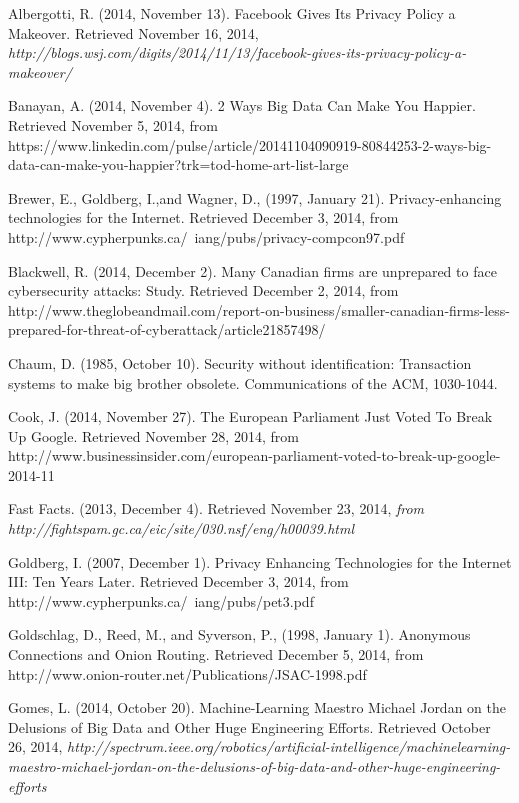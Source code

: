 \documentclass[12pt]{article}
\begin{document}
\clearpage
\singlespace
\begin{thebibliography}{99}
	Albergotti, R. (2014, November 13). Facebook Gives Its Privacy Policy a Makeover. Retrieved November 16, 2014, {\sl http://blogs.wsj.com/digits/2014/11/13/facebook-gives-its-privacy-policy-a-makeover/}

	Banayan, A. (2014, November 4). 2 Ways Big Data Can Make You Happier. Retrieved November 5, 2014, from https://www.linkedin.com/pulse/article/20141104090919-80844253-2-ways-big-data-can-make-you-happier?trk=tod-home-art-list-large

	Brewer, E., Goldberg, I.,and  Wagner, D., (1997, January 21). Privacy-enhancing technologies for the Internet. Retrieved December 3, 2014, from http://www.cypherpunks.ca/~iang/pubs/privacy-compcon97.pdf

	Blackwell, R. (2014, December 2). Many Canadian firms are unprepared to face cybersecurity attacks: Study. Retrieved December 2, 2014, from http://www.theglobeandmail.com/report-on-business/smaller-canadian-firms-less-prepared-for-threat-of-cyberattack/article21857498/

	Chaum, D. (1985, October 10). Security without identification: Transaction systems to make big brother obsolete. Communications of the ACM, 1030-1044.

	Cook, J. (2014, November 27). The European Parliament Just Voted To Break Up Google. Retrieved November 28, 2014, from http://www.businessinsider.com/european-parliament-voted-to-break-up-google-2014-11

	Fast Facts. (2013, December 4). Retrieved November 23, 2014, {\sl from http://fightspam.gc.ca/eic/site/030.nsf/eng/h\textunderscore00039.html}

	Goldberg, I. (2007, December 1). Privacy Enhancing Technologies for the Internet III: Ten Years Later. Retrieved December 3, 2014, from http://www.cypherpunks.ca/~iang/pubs/pet3.pdf

	Goldschlag, D., Reed, M., and Syverson, P., (1998, January 1). Anonymous Connections and Onion Routing. Retrieved December 5, 2014, from http://www.onion-router.net/Publications/JSAC-1998.pdf

	Gomes, L. (2014, October 20). Machine-Learning Maestro Michael Jordan on the Delusions of Big Data and Other Huge Engineering Efforts. Retrieved October 26, 2014, {\sl http://spectrum.ieee.org/robotics/artificial-intelligence/machinelearning-maestro-michael-jordan-on-the-delusions-of-big-data-and-other-huge-engineering-efforts}


\end{thebibliography}
\end{document}
